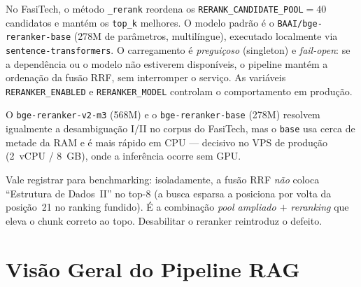 \documentclass[12pt,a4paper]{report}
\begin{document}
No FasiTech, o método \texttt{\_rerank} reordena os
\texttt{RERANK\_CANDIDATE\_POOL}$=40$ candidatos e mantém os \texttt{top\_k}
melhores. O modelo padrão é o \texttt{BAAI/bge-reranker-base} (278M de
parâmetros, multilíngue), executado localmente via
\texttt{sentence-transformers}. O carregamento é \emph{preguiçoso} (singleton)
e \emph{fail-open}: se a dependência ou o modelo não estiverem disponíveis, o
pipeline mantém a ordenação da fusão RRF, sem interromper o serviço. As
variáveis \texttt{RERANKER\_ENABLED} e \texttt{RERANKER\_MODEL} controlam o
comportamento em produção.

\begin{insight}[title=Por que bge-reranker-base e não v2-m3?]
O \texttt{bge-reranker-v2-m3} (568M) e o \texttt{bge-reranker-base} (278M)
resolvem igualmente a desambiguação I/II no corpus do FasiTech, mas o
\texttt{base} usa cerca de metade da RAM e é mais rápido em CPU — decisivo no
VPS de produção (2~vCPU / 8~GB), onde a inferência ocorre sem GPU.
\end{insight}

\begin{insight}[title=Dependência do reranker para a correção do caso ``II'']
Vale registrar para benchmarking: isoladamente, a fusão RRF \emph{não} coloca
``Estrutura de Dados~II'' no top-8 (a busca esparsa a posiciona por volta da
posição~21 no ranking fundido). É a combinação \emph{pool ampliado $+$
reranking} que eleva o chunk correto ao topo. Desabilitar o reranker reintroduz
o defeito.
\end{insight}

\section{Visão Geral do Pipeline RAG}
\end{document}
